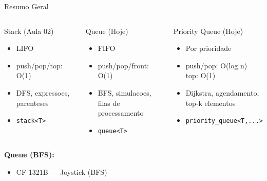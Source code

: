 \documentclass[aspectratio=169,11pt]{beamer}
\begin{document}
\begin{frame}[shrink=5]{Resumo Geral}
  \begin{columns}[t]
      \begin{block}{Stack (Aula 02)}
        \begin{itemize}\footnotesize
          \item LIFO
          \item push/pop/top: O(1)
          \item DFS, expressoes,\\parenteses
          \item \texttt{stack<T>}
        \end{itemize}
      \end{block}
      \begin{block}{Queue (Hoje)}
        \begin{itemize}\footnotesize
          \item FIFO
          \item push/pop/front: O(1)
          \item BFS, simulacoes,\\filas de processamento
          \item \texttt{queue<T>}
        \end{itemize}
      \end{block}
      \begin{block}{Priority Queue (Hoje)}
        \begin{itemize}\footnotesize
          \item Por prioridade
          \item push/pop: O(log n)\\top: O(1)
          \item Dijkstra, agendamento,\\top-k elementos
          \item \texttt{priority\_queue<T,...>}
        \end{itemize}
      \end{block}
  \end{columns}
  \vspace{0.15cm}
  \begin{columns}[t]
      \begin{tcolorbox}[caixaVerde,title={Problemas para Praticar}]
        \footnotesize
        \textbf{Queue (BFS):}
        \begin{itemize}
          \item CF 1321B --- Joystick (BFS)

\end{itemize}
\end{tcolorbox}
\end{columns}
\end{frame}
\end{document}
